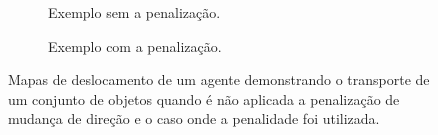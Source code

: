 \begin{figure}[htpb]
  \centering
  \setlength{\fboxsep}{0pt}

  \begin{subfigure}[t]{0.45\textwidth}
    \centering
    \caption{Exemplo sem a penalização.}
    \label{fig:ambiente_penalizacao_sem}
  \end{subfigure}
  \hspace{0.2cm}
  \begin{subfigure}[t]{0.45\textwidth}
    \centering
    \caption{Exemplo com a penalização.}
    \label{fig:ambiente_penalizacao_com}
  \end{subfigure}

  \caption[Deslocamento de um agente sem a aplicação da penalização de mudança de direção]{Mapas de deslocamento de um agente demonstrando o transporte de um conjunto de objetos quando é não aplicada a penalização de mudança de direção e o caso onde a penalidade foi utilizada.}
  \label{fig:ambiente_penalizacao_testes}

\end{figure}

